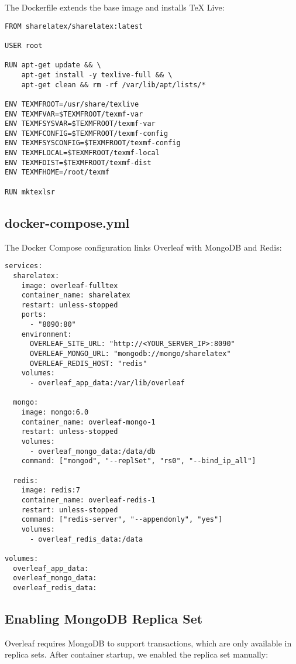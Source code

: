 The Dockerfile extends the base image and installs \TeX{} Live:

\begin{verbatim}
FROM sharelatex/sharelatex:latest

USER root

RUN apt-get update && \
    apt-get install -y texlive-full && \
    apt-get clean && rm -rf /var/lib/apt/lists/*

ENV TEXMFROOT=/usr/share/texlive
ENV TEXMFVAR=$TEXMFROOT/texmf-var
ENV TEXMFSYSVAR=$TEXMFROOT/texmf-var
ENV TEXMFCONFIG=$TEXMFROOT/texmf-config
ENV TEXMFSYSCONFIG=$TEXMFROOT/texmf-config
ENV TEXMFLOCAL=$TEXMFROOT/texmf-local
ENV TEXMFDIST=$TEXMFROOT/texmf-dist
ENV TEXMFHOME=/root/texmf

RUN mktexlsr
\end{verbatim}

\subsection{docker-compose.yml}

The Docker Compose configuration links Overleaf with MongoDB and Redis:

\begin{verbatim}
services:
  sharelatex:
    image: overleaf-fulltex
    container_name: sharelatex
    restart: unless-stopped
    ports:
      - "8090:80"
    environment:
      OVERLEAF_SITE_URL: "http://<YOUR_SERVER_IP>:8090"
      OVERLEAF_MONGO_URL: "mongodb://mongo/sharelatex"
      OVERLEAF_REDIS_HOST: "redis"
    volumes:
      - overleaf_app_data:/var/lib/overleaf

  mongo:
    image: mongo:6.0
    container_name: overleaf-mongo-1
    restart: unless-stopped
    volumes:
      - overleaf_mongo_data:/data/db
    command: ["mongod", "--replSet", "rs0", "--bind_ip_all"]

  redis:
    image: redis:7
    container_name: overleaf-redis-1
    restart: unless-stopped
    command: ["redis-server", "--appendonly", "yes"]
    volumes:
      - overleaf_redis_data:/data

volumes:
  overleaf_app_data:
  overleaf_mongo_data:
  overleaf_redis_data:
\end{verbatim}

\subsection{Enabling MongoDB Replica Set}

Overleaf requires MongoDB to support transactions, which are only available in replica sets. After container startup, we enabled the replica set manually:

